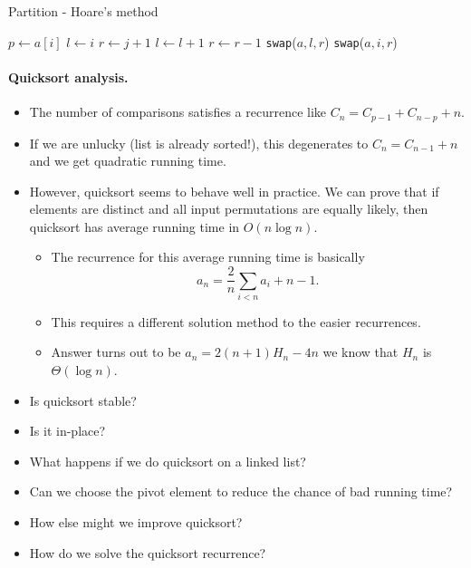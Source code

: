 \begin{algorithm}[H]
  \caption{Partition - Hoare's method}
    \label{alg:partition}
\begin{algorithmic}[0]
\State $p \gets a[i]$ 
\State $l \gets i $ 
\State $r \gets j+1$ 
\Repeat
\State $l\gets l+1 $ 
\Repeat
\State $r \gets r-1 $ 
\State \texttt{swap}($a,l,r$)  
\Else
\State \texttt{swap}($a,i,r$)  
\State {}
\EndIf
\EndWhile
\EndFunction  
\end{algorithmic}
\end{algorithm}

\paragraph{Quicksort analysis.}
\begin{itemize}
\item The number of comparisons satisfies a recurrence like 
$C_n = C_{p-1} + C_{n - p} + n$.
\item If we are unlucky (list is already sorted!), this degenerates to 
$C_{n} = C_{n-1} + n$ and we get quadratic running time.
\item However, quicksort seems to behave well in practice. We can prove that 
if elements are distinct and all input permutations are equally likely, then 
quicksort has average running time in $O(n \log n)$.
\begin{itemize}
\item The recurrence for this average running time is basically
$$ a_n = \frac{2}{n} \sum_{i<n} a_i + n-1. $$ 
\item This requires a different solution method to the easier recurrences.
\item  Answer turns out to be $a_n = 2 (n + 1) H_n - 4n$ we know 
that $H_n$ is $\Theta(\log n)$.
\end{itemize}
\end{itemize}

\begin{itemize}
\item Is quicksort stable?
\item Is it in-place?
\item What happens if we do quicksort on a linked list?
\item Can we choose the pivot element to reduce the chance of bad running time?
\item How else might we improve quicksort?
\item How do we solve the quicksort recurrence?
\end{itemize}

